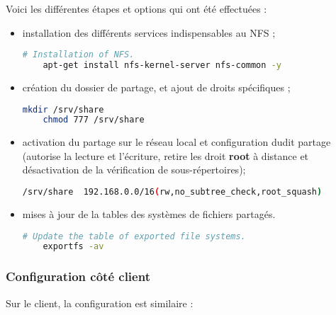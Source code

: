 Voici les différentes étapes et options qui ont été effectuées :
\begin{itemize}
\item installation des différents services indispensables au NFS ;

  \begin{lstlisting}[language=bash]
    # Installation of NFS.
    apt-get install nfs-kernel-server nfs-common -y
  \end{lstlisting}

\item création du dossier de partage, et ajout de droits
  spécifiques ;

  \begin{lstlisting}[language=bash]
    mkdir /srv/share
    chmod 777 /srv/share
  \end{lstlisting}

\item activation du partage sur le réseau local et configuration dudit
  partage (autorise la lecture et l'écriture, retire les droit \textbf{root} à
  distance et désactivation de la vérification de sous-répertoires);

  \begin{lstlisting}[language=bash]
    /srv/share  192.168.0.0/16(rw,no_subtree_check,root_squash)
  \end{lstlisting}

\item mises à jour de la tables des systèmes de fichiers partagés.

  \begin{lstlisting}[language=bash]
    # Update the table of exported file systems.
    exportfs -av
  \end{lstlisting}
\end{itemize}

\subsubsection{Configuration côté client}
\label{subsubsec:config-client}

Sur le client, la configuration est similaire :

